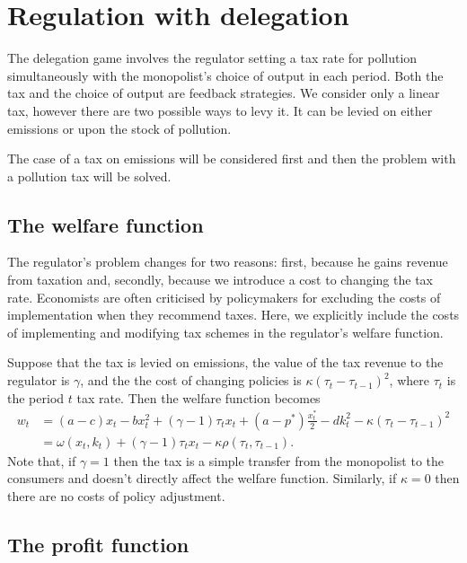 \documentclass{amsart}
\begin{document}
\section{Regulation with delegation}
\label{sec:regul-with-deleg}

The delegation game involves the regulator setting a tax rate for
pollution simultaneously with the monopolist's choice of output in
each period. Both the tax and the choice of output are feedback
strategies. We consider only a linear tax, however there are two
possible ways to levy it. It can be levied on either emissions or upon
the stock of pollution.

The case of a tax on emissions will be considered first and then the
problem with a pollution tax will be solved.

\subsection{The welfare function}
\label{sec:welfare-function}

The regulator's problem changes for two reasons: first, because he
gains revenue from taxation and, secondly, because we introduce a cost
to changing the tax rate. Economists are often criticised by
policymakers for excluding the costs of implementation when they
recommend taxes. Here, we explicitly include the costs of implementing
and modifying tax schemes in the regulator's welfare function.

Suppose that the tax is levied on emissions, the value of the tax
revenue to the regulator is $\gamma$, and the the cost of changing
policies is $\kappa (\tau_t-\tau_{t-1})^2$, where $\tau_t$ is the
period $t$ tax rate. Then the welfare function becomes
\begin{align}
  \label{eq:23} w_t &= (a-c)x_t - bx_t^2 + (\gamma -1)\tau_tx_t +
(a-p^*)\frac{x_t^*}{2} - dk_t^2 - \kappa (\tau_t-\tau_{t-1})^2 \\ &=
\omega(x_t,k_t) + (\gamma -1)\tau_tx_t - \kappa \rho(\tau_t,\tau_{t-1}).
\end{align} Note that, if $\gamma=1$ then the tax is a simple transfer
from the monopolist to the consumers and doesn't directly affect the
welfare function. Similarly, if $\kappa=0$ then there are no costs of
policy adjustment.

\subsection{The profit function}
\label{sec:profit-function}
\end{document}
